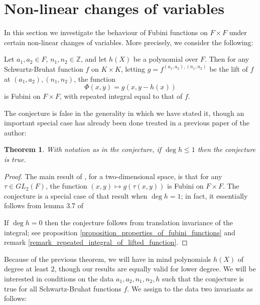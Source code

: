 \documentclass{lmsMODIFIED}
\newtheorem{theorem}{Theorem}[section] %
\newcommand{\bb}[1]{\mathbb{#1}}
\begin{document}

\section{Non-linear changes of variables}

In this section we investigate the behaviour of Fubini functions on $F\times F$ under certain non-linear changes of variables. More precisely, we consider the following:

\begin{conjecture}\label{conjecture}
Let $a_1,a_2\in F$, $n_1,n_2\in\bb{Z}$, and let $h(X)$ be a polynomial over $F$. Then for any Schwartz-Bruhat function $f$ on $K\times K$, letting $g=f^{(a_1,a_2),(n_1,n_2)}$ be the lift of $f$  at $(a_1,a_2),(n_1,n_2)$, the function \[\Phi(x,y)=g(x,y-h(x))\] is Fubini on $F\times F$, with repeated integral equal to that of $f$.
\end{conjecture}

The conjecture is false in the generality in which we have stated it, though an important special case has already been done treated in a previous paper of the author:

\begin{theorem}\label{theorem_linear_case}
With notation as in the conjecture, if $\deg h\le 1$ then the conjecture is true.
\end{theorem}
\begin{proof}
The main result of \cite{Morrow2008a}, for a two-dimensional space, is that for any $\tau\in GL_2(F)$, the function $(x,y)\mapsto g(\tau(x,y))$ is Fubini on $F\times F$. The conjecture is a special case of that result when $\deg h=1$; in fact, it essentially follows from lemma 3.7 of \cite{Morrow2008a}

If $\deg h=0$ then the conjecture follows from translation invariance of the integral; see proposition \ref{proposition_properties_of_fubini_functions} and remark \ref{remark_repeated_integral_of_lifted_function}.
\end{proof}

Because of the previous theorem, we will have in mind polynomials $h(X)$ of degree at least $2$, though our results are equally valid for lower degree. We will be interested in conditions on the data $a_1,a_2,n_1,n_2,h$ such that the conjecture is true for all Schwartz-Bruhat functions $f$. We assign to the data two invariants as follows:
\end{document}
